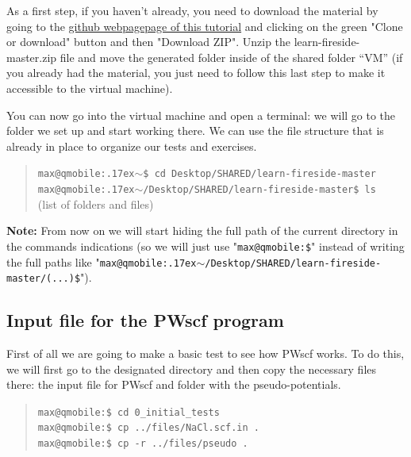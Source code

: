 \documentclass[12pt]{article}
\newcommand{\mytilde}{\raise.17ex\hbox{$\scriptstyle\mathtt{\sim}$}}
\begin{document}
As a first step, if you haven't already, you need to download the material by
going to the 
\href{https://github.com/materialscloud-org/learn-fireside}
{github webpagepage of this tutorial}
and clicking on the green "Clone or download" button and then "Download ZIP".
Unzip the learn-fireside-master.zip file and move the generated folder inside of
the shared folder “VM” (if you already had the material, you just need to follow
this last step to make it accessible to the virtual machine).

You can now go into the virtual machine and open a terminal: we will go to the
folder we set up and start working there. We can use the file structure that is
already in place to organize our tests and exercises.
\begin{quotation}
    \noindent
    {\tt max@qmobile:\mytilde\$ cd Desktop/SHARED/learn-fireside-master } \\
    {\tt max@qmobile:\mytilde/Desktop/SHARED/learn-fireside-master\$ ls } \\
    
    (list of folders and files)
\end{quotation}

{\bf Note:} From now on we will start hiding the full path of the current directory in the
commands indications (so we will just use "{\tt max@qmobile:\$}" instead of writing
the full paths like
"{\tt max@qmobile:\mytilde/Desktop/SHARED/learn-fireside-master/(...)\$}").


\vspace{6mm}
\subsection{Input file for the PWscf program}

    First of all we are going to make a basic test to see how PWscf works. 
    To do this, we will first go to the designated directory and then copy the necessary
    files there: the input file for PWscf and folder with the pseudo-potentials.

    \begin{quotation}
        \noindent
        {\tt max@qmobile:\$ cd 0\_initial\_tests } \\
        {\tt max@qmobile:\$ cp ../files/NaCl.scf.in .}\\
        {\tt max@qmobile:\$ cp -r ../files/pseudo . } \\
    \end{quotation}
      
\end{document}
